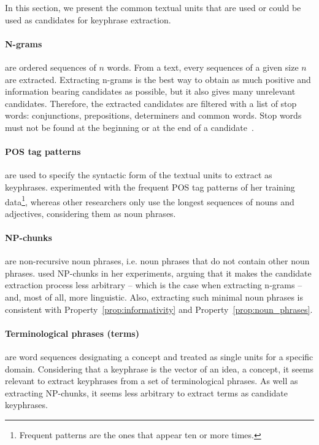   In this section, we present the common textual units that are used or could be
  used as candidates for keyphrase extraction.

  \paragraph{N-grams} are ordered sequences of $n$ words. From a text, every
  sequences of a given size $n$ are extracted. Extracting n-grams is the best
  way to obtain as much positive and information bearing candidates as possible,
  but it also gives many unrelevant candidates. Therefore, the extracted
  candidates are filtered with a list of stop words: conjunctions, prepositions,
  determiners  and common words. Stop words must not be found at the beginning
  or at the end of a
  candidate~\cite{witten1999kea,turney1999learningalgorithms}.

  \paragraph{POS tag patterns} are used to specify the syntactic form of the
  textual units to extract as keyphrases. 
  experimented with the frequent POS tag patterns of her training
  data\footnote{Frequent patterns are the ones that appear ten or more times.},
  whereas other researchers only use the longest sequences of nouns and
  adjectives, considering them as noun phrases.

  \paragraph{NP-chunks} are non-recursive noun phrases, i.e. noun phrases that
  do not contain other noun phrases.  used
  NP-chunks in her experiments, arguing that it makes the candidate extraction
  process less arbitrary -- which is the case when extracting n-grams -- and,
  most of all, more linguistic. Also, extracting such minimal noun phrases is
  consistent with Property~\ref{prop:informativity} and
  Property~\ref{prop:noun_phrases}.

  \paragraph{Terminological phrases (terms)} are word sequences designating a
  concept and treated as single units for a specific domain. Considering that a
  keyphrase is the vector of an idea, a concept, it seems relevant to extract
  keyphrases from  a set of terminological phrases. As well as extracting
  NP-chunks, it seems less arbitrary to extract terms as candidate keyphrases.


